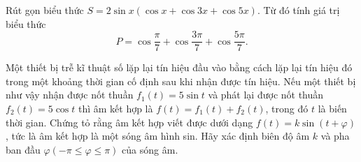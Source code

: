 \begin{vd}%
	Rút gọn biểu thức $S=2\sin x\left(\cos x+\cos 3x+\cos 5x\right)$. Từ đó tính giá trị biểu thức $$P=\cos \dfrac{\pi}{7}+\cos \dfrac{3\pi}{7}+\cos \dfrac{5\pi}{7}.$$
\end{vd}
\begin{vd}
	Một thiết bị trễ kĩ thuật số lặp lại tín hiệu đầu vào bằng cách lặp lại tín hiệu đó trong một khoảng thời gian cố định sau khi nhận được tín hiệu. Nếu một thiết bị như vậy nhận được nốt thuần $f_1(t)=5 \sin t$ và phát lại được nốt thuần $f_2(t)=5 \cos t$ thì âm kết hợp là $f(t)=f_1(t)+f_2(t)$, trong đó $t$ là biến thời gian. Chứng tỏ rằng âm kết hợp viết được dưới dạng $f(t)=k \sin (t+\varphi)$, tức là âm kết hợp là một sóng âm hình sin. Hãy xác định biên độ âm $k$ và pha ban đầu $\varphi(-\pi \leq \varphi \leq \pi)$ của sóng âm.
\end{vd} 

